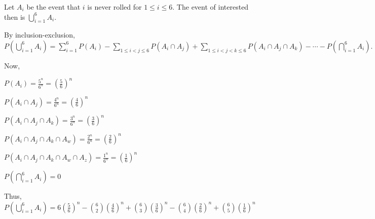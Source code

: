 Let $A_{i}$ be the event that $i$ is never rolled for $1 \leq i \leq 6$.
The event of interested then is $\bigcup\limits_{i=1}^{6}A_{i}.$

By inclusion-exclusion, 
$P(\bigcup\limits_{i=1}^{6}A_{i}) = \sum_{i=1}^{6}P(A_{i}) - \sum_{1 \leq i < j \leq 6}P(A_{i} \cap A_{j}) + \sum_{1 \leq i < j < k \leq 6}P(A_{i} \cap A_{j} \cap A_{k}) - \cdots - P(\bigcap\limits_{i=1}^{6}A_{i}).$

Now,


$P(A_{i}) = \frac{5^{n}}{6^{n}} = (\frac{5}{6})^{n}$

$P(A_{i} \cap A_{j}) = \frac{4^{n}}{6^{n}} = (\frac{4}{6})^{n}$

$P(A_{i} \cap A_{j} \cap A_{k}) = \frac{3^{n}}{6^{n}} = (\frac{3}{6})^{n}$

$P(A_{i} \cap A_{j} \cap A_{k} \cap A_{w}) = \frac{2^{n}}{6^{n}} = (\frac{2}{6})^{n}$

$P(A_{i} \cap A_{j} \cap A_{k} \cap A_{w} \cap A_{z}) = \frac{1^{n}}{6^{n}} = (\frac{1}{6})^{n}$

$P(\bigcap\limits_{i=1}^{6}A_{i}) = 0$

Thus, 
$P(\bigcup\limits_{i=1}^{6}A_{i}) = 6(\frac{5}{6})^{n} - \binom{6}{2}(\frac{4}{6})^{n} + \binom{6}{3}(\frac{3}{6})^{n} - \binom{6}{4}(\frac{2}{6})^{n} + \binom{6}{5}(\frac{1}{6})^{n}$